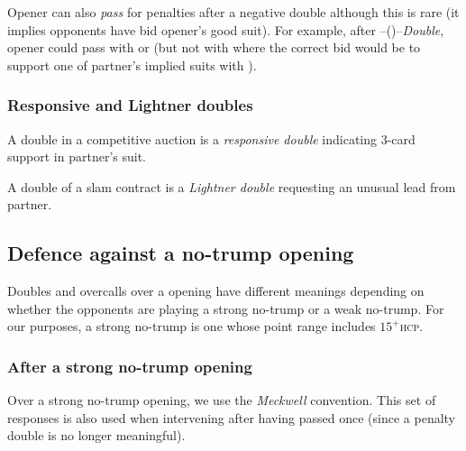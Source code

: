 \documentclass[a4paper,article,oneside]{memoir}
\newcommand{\hcp}{\textsc{hcp}}
\begin{document}
Opener can also \emph{pass} for penalties after a negative double
although this is rare (it implies opponents have bid opener's good
suit). For example, after --()--\emph{Double}, opener
could pass with  or 
(but not with  where the correct bid would be
to support one of partner's implied suits with ).

\subsubsection{Responsive and Lightner doubles}

A double in a competitive auction is a \emph{responsive double}
indicating 3-card support in partner's suit.

A double of a slam contract is a \emph{Lightner double} requesting an
unusual lead from partner.

\subsection{Defence against a no-trump opening}

Doubles and overcalls over a  opening have different meanings
depending on whether the opponents are playing a strong no-trump or a
weak no-trump. For our purposes, a strong no-trump is one whose point
range includes $15^+$\hcp.

\subsubsection{After a strong no-trump opening}

Over a strong no-trump opening, we use the \emph{Meckwell}
convention. This set of responses is also used when intervening after
having passed once (since a penalty double is no longer meaningful).
\end{document}
